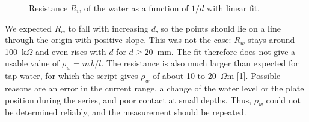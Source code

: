 \documentclass[12pt,a4paper]{article}
\begin{document}
\begin{figure}[H]
  \centering
  \caption{Resistance $R_w$ of the water as a function of $1/d$ with linear fit.}
  \label{fig:water}
\end{figure}

We expected $R_w$ to fall with increasing $d$, so the points should lie on a line through the origin with positive slope. This was not the case: $R_w$ stays around 100~k$\Omega$ and even rises with $d$ for $d \geq 20$~mm. The fit therefore does not give a usable value of $\rho_w = m\,b/l$. The resistance is also much larger than expected for tap water, for which the script gives $\rho_w$ of about 10 to 20~$\Omega$m [1]. Possible reasons are an error in the current range, a change of the water level or the plate position during the series, and poor contact at small depths. Thus, $\rho_w$ could not be determined reliably, and the measurement should be repeated.
\end{document}
